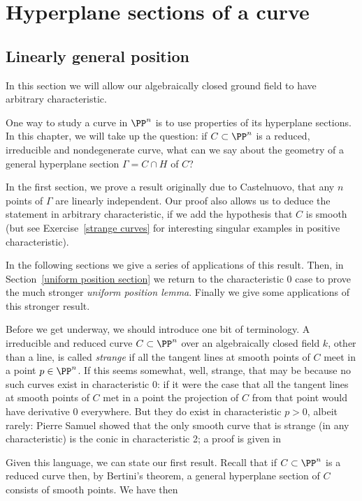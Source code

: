 



\chapter{Hyperplane sections of a curve}\label{uniform position}

\section{Linearly general position}
In this section we will allow our algebraically closed ground field to have arbitrary characteristic. 

One way to study a curve in $\PP^n$ is to use properties of its hyperplane sections. In this chapter, we will take up the question: if $C \subset \PP^n$ is a reduced, irreducible and nondegenerate curve, what can we say about the geometry of a general hyperplane section $\Gamma = C \cap H$ of $C$?

In the first section, we prove a result originally due to Castelnuovo, that any $n$ points of $\Gamma$ are linearly independent. Our proof also allows us to deduce the statement in arbitrary characteristic, if we add the hypothesis that $C$ is smooth (but see Exercise~\ref{strange curves} for
interesting singular examples in positive characteristic). 

In the following sections we give a series of applications of this result. Then, in Section~\ref{uniform position section} we return to the characteristic 0 case to prove the much stronger \emph{uniform position lemma}. Finally we give some applications
of this stronger result.

Before we get underway, we should introduce one bit of terminology. A irreducible and reduced curve
$C\subset \PP^n$ over an algebraically closed field $k$, other than a line, is called \emph{strange} if
all the tangent lines at smooth points of $C$ meet in a point $p\in \PP^n$. If this seems somewhat, well, strange, that may be because no such curves exist in characteristic 0: if it were the case that all the tangent lines at smooth points of $C$ met in a point the projection of $C$ from that point would have derivative 0 everywhere. But they do exist in characteristic $p > 0$, albeit rarely: Pierre Samuel showed that the only smooth curve that is strange (in any characteristic) is the conic in characteristic 2; a proof is given in \cite[Theorem IV.3.9]{Hartshorne1977} 


Given this language, we can state our first result. Recall that if $C\subset \PP^n$ is a reduced curve then, by Bertini's theorem, a general hyperplane
section of $C$ consists of smooth points. We have then

